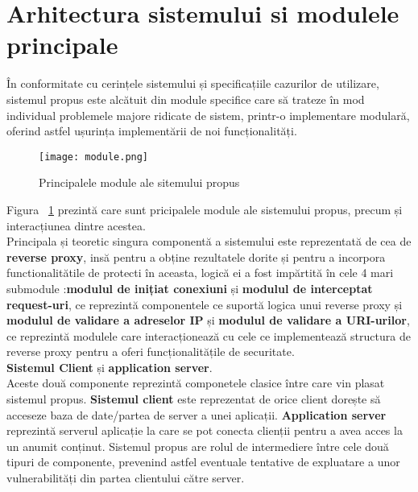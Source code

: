 \newpage


\section{Arhitectura sistemului si modulele principale}

În conformitate cu cerințele sistemului și specificațiile cazurilor de utilizare, sistemul propus este alcătuit din module specifice care să trateze în mod individual problemele majore ridicate de sistem, printr-o implementare modulară, oferind astfel ușurința implementării de noi funcționalități. 

\begin{figure}[h]
	\centering
	\texttt{[image: module.png]}
	\caption{Principalele module ale sitemului propus}
	\label{fig:module}
\end{figure}
Figura ~\ref{fig:module}  prezintă care sunt pricipalele module ale sistemului propus, precum și interacțiunea dintre acestea. \\

Principala și teoretic singura componentă a sistemului este reprezentată de cea de \textbf{reverse proxy}, insă pentru a obține rezultatele dorite și pentru a incorpora functionalitătile de protecti în aceasta, logică ei a fost impărtită în cele 4 mari submodule :\textbf{modulul de inițiat conexiuni} și \textbf{modulul de interceptat request-uri}, ce reprezintă componentele ce suportă logica unui reverse proxy și \textbf{modulul de validare a adreselor IP} și \textbf{modulul de validare a URI-urilor}, ce reprezintă modulele care interacționează cu cele ce implementează structura de reverse proxy pentru a oferi funcționalitățile de securitate. \\




\textbf{Sistemul Client} și  \textbf{application server}.\\ 

Aceste două componente reprezintă componetele clasice între care vin plasat sistemul propus. \textbf{Sistemul client} este reprezentat de orice client dorește să acceseze baza de date/partea de server a unei aplicații. \textbf{Application server} reprezintă serverul aplicație la care se pot conecta clienții pentru a avea acces la un anumit conținut. Sistemul propus are rolul de intermediere între cele două tipuri de componente, prevenind astfel eventuale tentative de expluatare a unor vulnerabilități din partea clientului către server.


